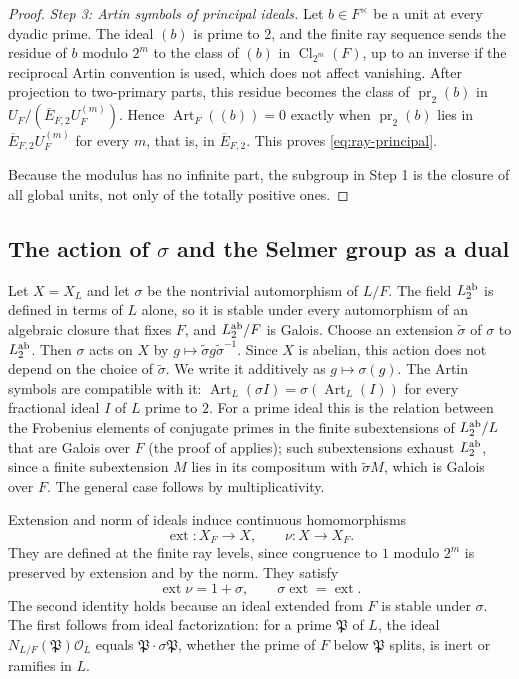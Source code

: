 \documentclass[11pt]{article}
\theoremstyle{plain}
\theoremstyle{definition}
\theoremstyle{remark}
\DeclareMathOperator{\Cl}{Cl}
\newcommand{\OO}{\mathcal O}
\begin{document}
\begin{proof}
\emph{Step 3: Artin symbols of principal ideals.}  Let $b\in F^\times$ be a
unit at every dyadic prime.  The ideal $(b)$ is prime to $2$, and the
finite ray sequence sends the residue of $b$ modulo $2^m$ to the class of
$(b)$ in $\Cl_{2^m}(F)$, up to an inverse if the reciprocal Artin
convention is used, which does not affect vanishing.  After projection to
two-primary parts, this residue becomes the class of
$\operatorname{pr}_2(b)$ in $U_F/(\overline E_{F,2}U_F^{(m)})$.  Hence
$\operatorname{Art}_F((b))=0$ exactly when $\operatorname{pr}_2(b)$ lies
in $\overline E_{F,2}U_F^{(m)}$ for every $m$, that is, in
$\overline E_{F,2}$.  This proves \eqref{eq:ray-principal}.

Because the modulus has no infinite part, the subgroup in Step 1 is the
closure of all global units, not only of the totally positive ones.
\end{proof}

\subsection{The action of \texorpdfstring{$\sigma$}{sigma} and the Selmer group as a dual}\label{sec:dyadic-kummer}

Let $X=X_L$ and let $\sigma$ be the nontrivial automorphism of $L/F$.  The
field $L^{\rm ab}_2$ is defined in terms of $L$ alone, so it is stable
under every automorphism of an algebraic closure that fixes $F$, and
$L^{\rm ab}_2/F$ is Galois.  Choose an extension $\tilde\sigma$ of
$\sigma$ to $L^{\rm ab}_2$.  Then $\sigma$ acts on $X$ by
$g\mapsto\tilde\sigma g\tilde\sigma^{-1}$.  Since $X$ is abelian, this
action does not depend on the choice of $\tilde\sigma$.  We write it
additively as $g\mapsto\sigma(g)$.  The Artin symbols are compatible with
it: $\operatorname{Art}_L(\sigma I)=\sigma(\operatorname{Art}_L(I))$ for
every fractional ideal $I$ of $L$ prime to $2$.  For a prime ideal this is
the relation between the Frobenius elements of conjugate primes in the
finite subextensions of $L^{\rm ab}_2/L$ that are Galois over $F$ (the
proof of \cite[8.14]{MilneANT} applies); such subextensions exhaust
$L^{\rm ab}_2$, since a finite subextension $M$ lies in its compositum
with $\tilde\sigma M$, which is Galois over $F$.  The general case
follows by multiplicativity.

Extension and norm of ideals induce continuous homomorphisms
\[
 \operatorname{ext}:X_F\longrightarrow X,\qquad \nu:X\longrightarrow X_F.
\]
They are defined at the finite ray levels, since congruence to $1$ modulo
$2^m$ is preserved by extension and by the norm.  They satisfy
\begin{equation}\label{eq:ray-transfer}
 \operatorname{ext}\nu=1+\sigma,\qquad
 \sigma\operatorname{ext}=\operatorname{ext}.
\end{equation}
The second identity holds because an ideal extended from $F$ is stable
under $\sigma$.  The first follows from ideal factorization: for a prime
$\mathfrak P$ of $L$, the ideal $N_{L/F}(\mathfrak P)\OO_L$ equals
$\mathfrak P\cdot\sigma\mathfrak P$, whether the prime of $F$ below
$\mathfrak P$ splits, is inert or ramifies in $L$.
\end{document}
